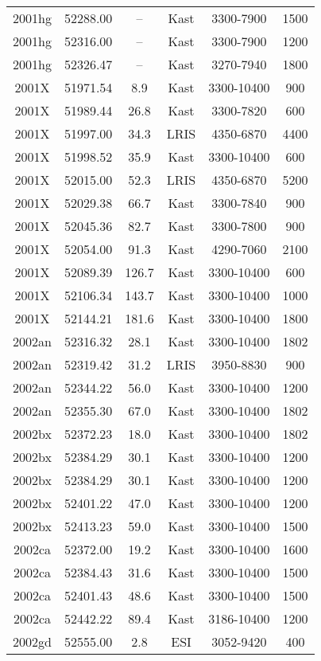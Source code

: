 \begin{table*}
\begin{tabular}{cccccc}
2001hg	 & 52288.00	 &--	 &Kast	 & 3300-7900 &1500 \\ 
2001hg	 & 52316.00	 &--	 &Kast	 & 3300-7900 &1200 \\ 
2001hg	 & 52326.47	 &--	 &Kast	 & 3270-7940 &1800 \\ 
2001X	 & 51971.54	 &8.9	 &Kast	 & 3300-10400 &900 \\ 
2001X	 & 51989.44	 &26.8	 &Kast	 & 3300-7820 &600 \\ 
2001X	 & 51997.00	 &34.3	 &LRIS	 & 4350-6870 &4400 \\ 
2001X	 & 51998.52	 &35.9	 &Kast	 & 3300-10400 &600 \\ 
2001X	 & 52015.00	 &52.3	 &LRIS	 & 4350-6870 &5200 \\ 
2001X	 & 52029.38	 &66.7	 &Kast	 & 3300-7840 &900 \\ 
2001X	 & 52045.36	 &82.7	 &Kast	 & 3300-7800 &900 \\ 
2001X	 & 52054.00	 &91.3	 &Kast	 & 4290-7060 &2100 \\ 
2001X	 & 52089.39	 &126.7	 &Kast	 & 3300-10400 &600 \\ 
2001X	 & 52106.34	 &143.7	 &Kast	 & 3300-10400 &1000 \\ 
2001X	 & 52144.21	 &181.6	 &Kast	 & 3300-10400 &1800 \\ 
2002an	 & 52316.32	 &28.1	 &Kast	 & 3300-10400 &1802 \\ 
2002an	 & 52319.42	 &31.2	 &LRIS	 & 3950-8830 &900 \\ 
2002an	 & 52344.22	 &56.0	 &Kast	 & 3300-10400 &1200 \\ 
2002an	 & 52355.30	 &67.0	 &Kast	 & 3300-10400 &1802 \\ 
2002bx	 & 52372.23	 &18.0	 &Kast	 & 3300-10400 &1802 \\ 
2002bx	 & 52384.29	 &30.1	 &Kast	 & 3300-10400 &1200 \\ 
2002bx	 & 52384.29	 &30.1	 &Kast	 & 3300-10400 &1200 \\ 
2002bx	 & 52401.22	 &47.0	 &Kast	 & 3300-10400 &1200 \\ 
2002bx	 & 52413.23	 &59.0	 &Kast	 & 3300-10400 &1500 \\ 
2002ca	 & 52372.00	 &19.2	 &Kast	 & 3300-10400 &1600 \\ 
2002ca	 & 52384.43	 &31.6	 &Kast	 & 3300-10400 &1500 \\ 
2002ca	 & 52401.43	 &48.6	 &Kast	 & 3300-10400 &1500 \\ 
2002ca	 & 52442.22	 &89.4	 &Kast	 & 3186-10400 &1200 \\ 
2002gd	 & 52555.00	 &2.8	 &ESI	 & 3052-9420 &400 \\ 

\end{tabular}
\end{table*}
